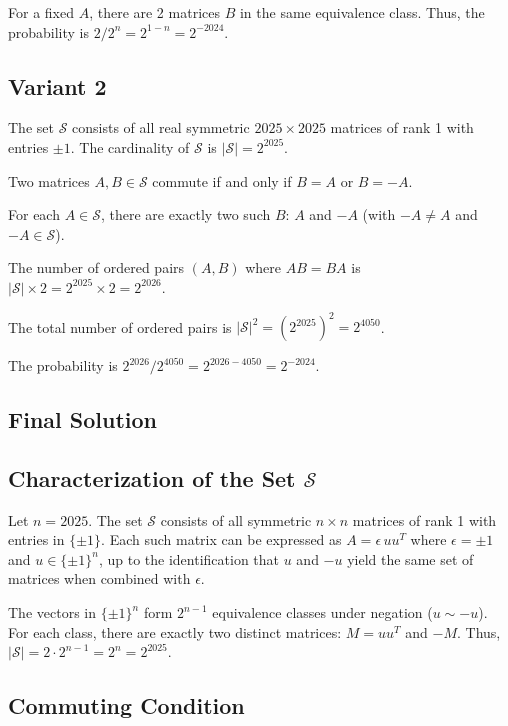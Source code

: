 \documentclass[12pt,a4paper]{article}
\theoremstyle{definition}
\begin{document}
    For a fixed $A$, there are 2 matrices $B$ in the same equivalence class. Thus, the probability is $2 / 2^n = 2^{1-n} = 2^{-2024}$.

\subsection{Variant 2}
    The set $\mathcal{S}$ consists of all real symmetric $2025 \times 2025$ matrices of rank 1 with entries $\pm 1$. The cardinality of $\mathcal{S}$ is $|\mathcal{S}| = 2^{2025}$.

    Two matrices $A, B \in \mathcal{S}$ commute if and only if $B = A$ or $B = -A$.

    For each $A \in \mathcal{S}$, there are exactly two such $B$: $A$ and $-A$ (with $-A \neq A$ and $-A \in \mathcal{S}$).

    The number of ordered pairs $(A, B)$ where $AB = BA$ is $|\mathcal{S}| \times 2 = 2^{2025} \times 2 = 2^{2026}$.

    The total number of ordered pairs is $|\mathcal{S}|^2 = (2^{2025})^2 = 2^{4050}$.

    The probability is $2^{2026} / 2^{4050} = 2^{2026 - 4050} = 2^{-2024}$.

\subsection{Final Solution}
    \subsection*{Characterization of the Set $\mathcal{S}$}

    Let $n = 2025$. The set $\mathcal{S}$ consists of all symmetric $n \times n$ matrices of rank 1 with entries in $\{\pm 1\}$. Each such matrix can be expressed as $A = \epsilon \, u u^T$ where $\epsilon = \pm 1$ and $u \in \{\pm 1\}^n$, up to the identification that $u$ and $-u$ yield the same set of matrices when combined with $\epsilon$.

    The vectors in $\{\pm 1\}^n$ form $2^{n-1}$ equivalence classes under negation ($u \sim -u$). For each class, there are exactly two distinct matrices: $M = u u^T$ and $-M$. Thus, $|\mathcal{S}| = 2 \cdot 2^{n-1} = 2^n = 2^{2025}$.

    \subsection*{Commuting Condition}
\end{document}
